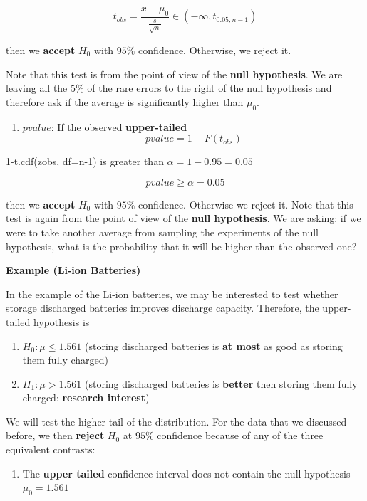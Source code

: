 \documentclass[
]{book}
\providecommand{\tightlist}{%
  \setlength{\itemsep}{0pt}\setlength{\parskip}{0pt}}
\begin{document}
\[t_{obs}=\frac{\bar{x}-\mu_0}{\frac{s}{\sqrt{n}}} \in (-\infty, t_{0.05, n-1})\]

then we \textbf{accept} \(H_0\) with \(95\%\) confidence. Otherwise, we reject it.

Note that this test is from the point of view of the \textbf{null hypothesis}. We are leaving all the \(5\%\) of the rare errors to the right of the null hypothesis and therefore ask if the average is significantly higher than \(\mu_0\).

\begin{enumerate}
\def\labelenumi{\arabic{enumi}.}
\setcounter{enumi}{2}
\tightlist
\item
  \(pvalue\): If the observed \textbf{upper-tailed} \[pvalue= 1-F(t_{obs})\]
\end{enumerate}

1-t.cdf(zobs, df=n-1) is greater than \(\alpha=1-0.95=0.05\)

\[pvalue \geq \alpha =0.05\]

then we \textbf{accept} \(H_0\) with \(95\%\) confidence. Otherwise we reject it. Note that this test is again from the point of view of the \textbf{null hypothesis}. We are asking: if we were to take another average from sampling the experiments of the null hypothesis, what is the probability that it will be higher than the observed one?

\textbf{Example (Li-ion Batteries)}

In the example of the Li-ion batteries, we may be interested to test whether storage discharged batteries improves discharge capacity. Therefore, the upper-tailed hypothesis is

\begin{enumerate}
\def\labelenumi{\alph{enumi}.}
\tightlist
\item
  \(H_0:\mu \leq 1.561\) (storing discharged batteries is \textbf{at most} as good as storing them fully charged)
\item
  \(H_1:\mu > 1.561\) (storing discharged batteries is \textbf{better} then storing them fully charged: \textbf{research interest})
\end{enumerate}

We will test the higher tail of the distribution.
For the data that we discussed before, we then \textbf{reject} \(H_0\) at \(95\%\) confidence because of any of the three equivalent contrasts:

\begin{enumerate}
\def\labelenumi{\arabic{enumi}.}
\tightlist
\item
  The \textbf{upper tailed} confidence interval does not contain the null hypothesis \(\mu_0=1.561\)
\end{enumerate}
\end{document}
